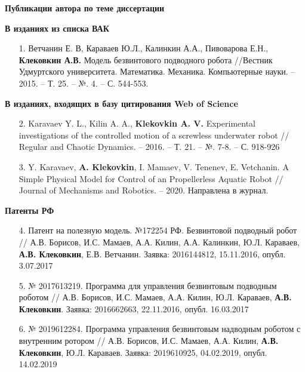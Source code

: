 {
\vspace{2mm}

{\large  \textbf{Публикации автора по теме диссертации}}

\textbf{В изданиях из списка ВАК}
\begin{enumerate}	
	\item[1.] Ветчанин Е. В, Караваев Ю.Л., Калинкин А.А., Пивоварова Е.Н., \textbf{Клековкин А.В.} Модель безвинтового подводного робота //Вестник Удмуртского университета. Математика. Механика. Компьютерные науки. -- 2015. -- Т. 25. -- №. 4. -- С. 544-553.
\end{enumerate}

\textbf{В изданиях, входящих в базу цитирования Web of Science}
\begin{enumerate}	
	\item[2.] Karavaev Y. L., Kilin A. A., \textbf{Klekovkin A. V.} Experimental investigations of the controlled motion of a screwless underwater robot // Regular and Chaotic Dynamics. -- 2016. -- Т. 21. -- №. 7-8. -- С. 918-926
	\item[3.] Y. Karavaev, \textbf{A. Klekovkin}, I. Mamaev, V. Tenenev, E. Vetchanin. A Simple Physical Model for Control of an Propellerless Aquatic Robot // Journal of Mechanisms and Robotics. -- 2020. Направлена в журнал.
\end{enumerate}

\textbf{Патенты РФ}
	\begin{enumerate}		
		\item[4.] Патент на полезную модель. №172254 РФ. Безвинтовой подводный робот //  А.В. Борисов, И.С. Мамаев, А.А. Килин, А.А. Калинкин, Ю.Л. Караваев, \textbf{А.В. Клековкин}, Е.В. Ветчанин. Заявка: 2016144812, 15.11.2016, опубл. 3.07.2017
		
		\item[5.] № 2017613219. Программа для управления безвинтовым подводным роботом // А.В. Борисов, И.С. Мамаев, А.А. Килин, Ю.Л. Караваев, \textbf{А.В. Клековкин}. Заявка: 2016662663, 22.11.2016, опубл. 16.03.2017
		
		\item[6.] № 2019612284. Программа управления безвинтовым надводным роботом с внутренним ротором // А.В. Борисов, И.С. Мамаев, А.А. Килин, \textbf{А.В. Клековкин}, Ю.Л. Караваев. Заявка: 2019610925, 04.02.2019, опубл. 14.02.2019
	\end{enumerate}
}


